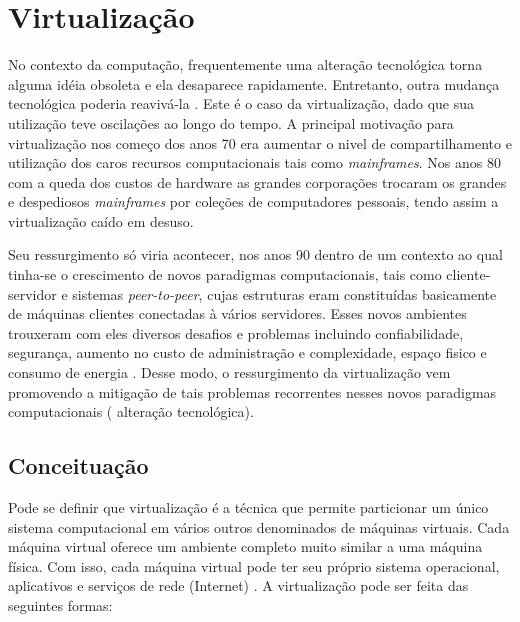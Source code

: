\chapter{Virtualização}
\label{cap:referencial_teorico}
No contexto da computação, frequentemente uma alteração tecnológica torna alguma idéia obsoleta e ela desaparece rapidamente. Entretanto, outra mudança tecnológica poderia reavivá-la \cite{tanembaum}. Este é o caso da virtualização, dado que sua utilização teve oscilações ao longo do tempo. A principal motivação para virtualização nos começo dos anos 70 era aumentar o nivel de compartilhamento e utilização dos caros recursos computacionais tais como \textit{mainframes}\cite{menasce}. Nos anos 80 com a queda dos custos de hardware as grandes corporações trocaram os grandes e despediosos \textit{mainframes} por coleções de computadores pessoais, tendo assim a virtualização caído em desuso.

 Seu ressurgimento só viria acontecer, nos anos 90 dentro de um contexto ao qual tinha-se o crescimento de novos paradigmas computacionais, tais como cliente-servidor  e sistemas \textit{peer-to-peer}, cujas estruturas eram constituídas basicamente de máquinas clientes conectadas à vários servidores. Esses novos ambientes trouxeram com eles diversos desafios e problemas incluindo confiabilidade, segurança, aumento no custo de administração e complexidade, espaço fisico e consumo de energia \cite{menasce}. Desse modo, o ressurgimento da virtualização vem promovendo a mitigação de tais problemas recorrentes nesses novos paradigmas computacionais ( alteração tecnológica).
 
\section{Conceituação} 
Pode se definir que virtualização é a técnica que permite particionar um único sistema computacional em vários outros denominados de máquinas virtuais. Cada máquina virtual oferece um ambiente completo muito similar a uma máquina física. Com isso, cada máquina virtual pode ter seu próprio sistema operacional, aplicativos e serviços de rede (Internet) \cite{carissimi}. A virtualização pode ser feita das seguintes formas:

